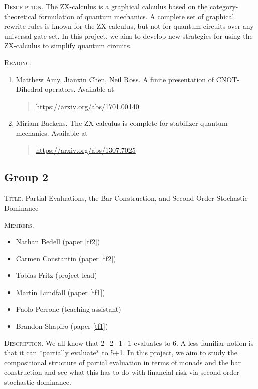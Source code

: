 \documentclass[11pt, oneside]{article}
\begin{document}
\textsc{Description.}  The ZX-calculus is a graphical
calculus based on the category-theoretical formulation of
quantum mechanics. A complete set of graphical rewrite rules
is known for the ZX-calculus, but not for quantum circuits
over any universal gate set. In this project, we aim to
develop new strategies for using the ZX-calculus to simplify
quantum circuits.

\textsc{Reading.}
\begin{enumerate}
\item \label{mb1}
  Matthew Amy, Jianxin Chen, Neil Ross. A finite
  presentation of CNOT-Dihedral operators. Available at
  \begin{quote}
    \href{https://arxiv.org/abs/1701.00140}{https://arxiv.org/abs/1701.00140}
  \end{quote}
\item \label{mb2}
  Miriam Backens. The ZX-calculus is complete for stabilizer
  quantum mechanics. Available at
  \begin{quote}
    \href{https://arxiv.org/abs/1307.7025}{https://arxiv.org/abs/1307.7025}
  \end{quote}
\end{enumerate}

\pagebreak

%
%

\subsection*{Group 2}

\textsc{Title.}  Partial Evaluations, the Bar
Construction, and Second Order Stochastic Dominance

\textsc{Members.}
\begin{multicols}{2}
  \begin{itemize}
  \item Nathan Bedell (paper \ref{tf2})
  \item Carmen Constantin (paper \ref{tf2})
  \item Tobias Fritz (project lead)
  \item Martin Lundfall (paper \ref{tf1})
  \item Paolo Perrone (teaching assistant)
  \item Brandon Shapiro (paper \ref{tf1})
  \end{itemize}
\end{multicols}


\textsc{Description.}
We all know that 2+2+1+1 evaluates to 6. A less familiar
notion is that it can *partially evaluate* to 5+1. In this
project, we aim to study the compositional structure of
partial evaluation in terms of monads and the bar
construction and see what this has to do with financial risk
via second-order stochastic dominance.
\end{document}
